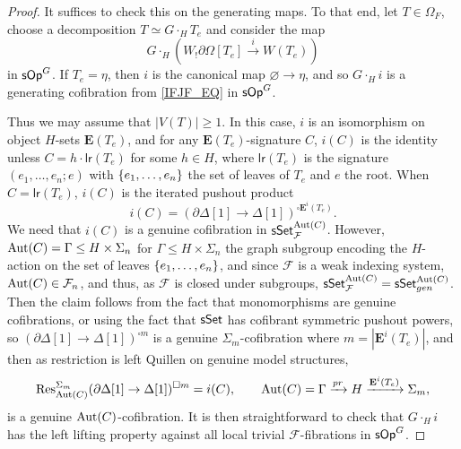 \documentclass[a4paper,10pt
,draft
]{article}%
\renewcommand{\F}{\mathcal F}
\renewcommand{\1}{\eta}%
\begin{document}
\begin{proof}
      It suffices to check this on the generating maps.
      To that end, let $T \in \Omega_F$, choose a decomposition $T \simeq G \cdot_H T_e$ and consider the map
      \begin{equation}
            G \cdot_H \left( W_! \partial \Omega[T_e] \xrightarrow{\ i \ } W(T_e) \right)      
      \end{equation}
      in $\mathsf{sOp}^G$.
      If $T_e = \eta$, then $i$ is the canonical map $\varnothing \to \eta$,
      and so $G \cdot_H i$ is a generating cofibration from \eqref{IFJF_EQ} in $\mathsf{sOp}^G$.

      Thus we may assume that $|V(T)| \geq 1$.
      In this case, $i$ is an isomorphism on object $H$-sets $\mathbf E(T_e)$,
      and for any $\mathbf E(T_e)$-signature $C$,
      $i(C)$ is the identity unless $C = h \cdot \mathsf{lr}(T_e)$ for some $h \in H$,
      where $\mathsf{lr}(T_e)$ is the signature $(e_1, \dots, e_n; e)$ 
      with $\left\{e_1,\dots, e_n\right\}$ the set of leaves of $T_e$ and $e$ the root.
      When $C = \mathsf{lr}(T_e)$, $i(C)$ is the iterated pushout product
      \[
            i(C) = (\partial \Delta[1] \to \Delta[1])^{\square \mathbf E^i(T_e)}.
      \]
      We need that $i(C)$ is a genuine cofibration in $\sSet^{\Aut(C)}_\F$.
      However, $\operatorname{Aut}(C) = \Gamma \leq H \times \Sigma_n$ for $\Gamma \leq H \times \Sigma_n$ the graph subgroup encoding the $H$-action on the set of leaves $\left\{e_1, \dots, e_n\right\}$,
      and since $\F$ is a weak indexing system, $\Aut(C) \in \F_n$,
      and thus, as $\F$ is closed under subgroups, $\sSet^{\Aut(C)}_\F = \sSet^{\Aut(C)}_{gen}$.
      Then the claim follows from the fact that monomorphisms are genuine cofibrations,
      {\color{OliveGreen} %
        or using the fact that $\mathsf{sSet}$ has cofibrant symmetric pushout powers,
        so $(\partial \Delta[1] \to \Delta[1])^{\square m}$ is a genuine $\Sigma_m$-cofibration where $m = |\mathbf E^i(T_e)|$,
        and then as restriction is left Quillen on genuine model structures,
        \[
              \mathrm{Res}^{\Sigma_m}_{\operatorname{Aut}(C)}(\partial \Delta[1] \to \Delta[1])^{\square m} = i(C),
              \qquad
              \operatorname{Aut}(C) = \Gamma \xrightarrow{pr} H \xrightarrow{\mathbf E^i(T_e)} \Sigma_m,
        \]
        is a genuine $\operatorname{Aut}(C)$-cofibration.
      } %
      It is then straightforward to check that $G \cdot_H i$ has the left lifting property against all local trivial $\F$-fibrations in $\mathsf{sOp}^G$.

\end{proof}
\end{document}
